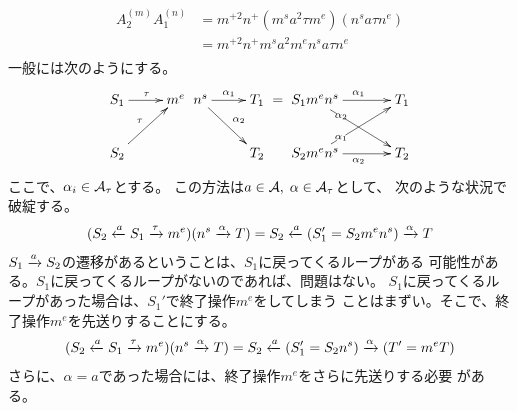 {	\begin{todo}[ここまで]\label{todo:ここまで} %
	\end{todo} %
	\begin{equation*}\begin{split}
		A_2^{(m)}A_1^{(n)} &= m^{+2}n^{+} (m^sa^2\tau m^e)(n^sa\tau n^e) \\
		&= m^{+2}n^{+} m^sa^2m^en^sa\tau n^e \\
	\end{split}\end{equation*}
	一般には次のようにする。
	\begin{equation*}\begin{split}
		\xymatrix {
			S_1 \ar[r]^\tau & m^e \\
			S_2 \ar[ru]^\tau \\
		} \xymatrix {
			n^s \ar[r]^{\alpha_1} \ar[rd]^{\alpha_2} & T_1 \\
			& T_2 \\
		} = \xymatrix @C+1em {
			S_1m^en^s \ar[r]^{\alpha_1} \ar[rd]|(0.3){\alpha_2} & T_1 \\
			S_2m^en^s \ar[r]_{\alpha_2} \ar[ru]|(0.3){\alpha_1} & T_2 \\
		}
	\end{split}\end{equation*}
	ここで、$\alpha_i\in{\ensuremath{{\mathcal{A}}}}_\tau$とする。
	この方法は$a\in{\ensuremath{{\mathcal{A}}}},\;\alpha\in{\ensuremath{{\mathcal{A}}}}_\tau$として、
	次のような状況で破綻する。
	\begin{equation*}\begin{split}
		(S_2 \xleftarrow[{}]{a} S_1 \xrightarrow[{}]{\tau} m^e) (n^s \xrightarrow[{}]{\alpha} T)
		= S_2 \xleftarrow[{}]{a} (S_1'=S_2m^en^s) \xrightarrow[{}]{\alpha} T
	\end{split}\end{equation*}
	$S_1\xrightarrow[{}]{a}S_2$の遷移があるということは、$S_1$に戻ってくるループがある
	可能性がある。$S_1$に戻ってくるループがないのであれば、問題はない。
	$S_1$に戻ってくるループがあった場合は、$S_1'$で終了操作$m^e$をしてしまう
	ことはまずい。そこで、終了操作$m^e$を先送りすることにする。
	\begin{equation*}\begin{split}
		(S_2 \xleftarrow[{}]{a} S_1 \xrightarrow[{}]{\tau} m^e) (n^s \xrightarrow[{}]{\alpha} T)
		= S_2 \xleftarrow[{}]{a} (S_1'=S_2n^s) \xrightarrow[{}]{\alpha} (T'=m^eT)
	\end{split}\end{equation*}
	さらに、$\alpha=a$であった場合には、終了操作$m^e$をさらに先送りする必要
	がある。

}

